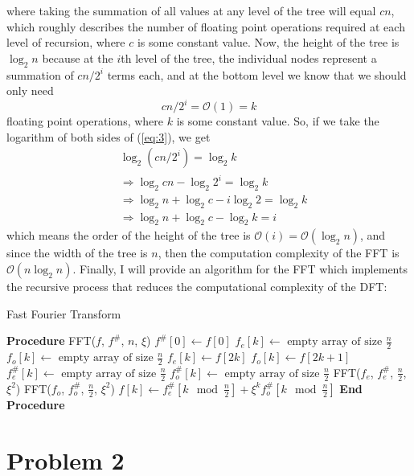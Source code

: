 \documentclass[11pt]{article}
\begin{document}
where taking the summation of all values at any level of the tree will equal $cn$, which roughly describes
the number of floating point operations required at each level of recursion, where $c$ is some constant value.
Now, the height of the tree is $\log_2{n}$ because at the $i$th level of the tree, the
individual nodes represent a summation of $cn/2^i$ terms each, and at the bottom level we know that we should
only need 
\begin{equation}
	cn/2^i = \mathcal{O}(1) = k
	\label{eq:3}
\end{equation}
floating point operations, where $k$ is some constant value.
So, if
we take the logarithm of both sides of (\ref{eq:3}), we get
\begin{equation*}
	\begin{aligned}
		&\log_2{(cn/2^i)} = \log_2{k} \\
		&\Rightarrow\log_2{cn} - \log_2{2^i} = \log_2{k} \\
		&\Rightarrow\log_2{n} + \log_2{c} - i\log_2{2} = \log_2{k} \\
		&\Rightarrow\log_2{n} + \log_2{c} - \log_2{k} = i
	\end{aligned}
\end{equation*}
which means the order of the height of the tree is $\mathcal{O}(i) = \mathcal{O}(\log_2{n})$,
and since the width of the tree is $n$, then the computation complexity of the FFT is $\mathcal{O}(n\log_2{n})$.
Finally, I will provide an algorithm for the FFT which implements the recursive process that reduces the
computational complexity of the DFT:
\begin{algorithm}
\caption{Fast Fourier Transform}
\begin{algorithmic}[1]
	\STATE \textbf{Procedure} \textsc{FFT}($f$, $f^{\#}$, $n$, $\xi$)
	    \STATE $f^{\#}[0] \gets f[0]$
	\ELSE
		\STATE $f_e[k] \gets \text{ empty array of size } \frac{n}{2}$
		\STATE $f_o[k] \gets \text{ empty array of size } \frac{n}{2}$
			\STATE $f_e[k] \gets f[2k]$
			\STATE $f_o[k] \gets f[2k+1]$
		\ENDFOR
		\STATE $f_e^{\#}[k] \gets \text{ empty array of size } \frac{n}{2}$
		\STATE $f_o^{\#}[k] \gets \text{ empty array of size } \frac{n}{2}$
		\STATE \textsc{FFT}($f_e$, $f_e^{\#}$, $\frac{n}{2}$, $\xi^2$)
		\STATE \textsc{FFT}($f_o$, $f_o^{\#}$, $\frac{n}{2}$, $\xi^2$)
			\STATE $f[k] \gets f_e^{\#}[k \mod{\frac{n}{2}}] + \xi^k f_o^{\#}[k \mod{\frac{n}{2}}]$
		\ENDFOR
        \ENDIF
    \STATE \textbf{End Procedure}
\end{algorithmic}
\end{algorithm}

\newpage
\section{Problem 2}
\end{document}
